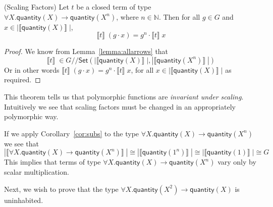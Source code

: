 \documentclass[a4paper,UKenglish]{lipics}
\newcommand{\msf}[1]{\mathsf{#1}} %
\newcommand{\Set}{\msf{Set}}
\newcommand{\GroupSet}[1]{#1/\!/\Set}
\newcommand{\GSet}{\GroupSet{G}}
\newcommand{\sem}[1]{\ensuremath{\llbracket #1 \rrbracket} \;}
\newcommand{\qnt}{\msf{quantity}}
\begin{document}
\begin{theorem}(Scaling Factors)
\label{thm:ScalFact}
Let $t$ be a closed term of type $\forall X. \qnt(X) \rightarrow \qnt(X^n)$, where $n\in \mathbb{N}$. Then for all $g \in G$ and $x \in |\sem{\qnt(X)}|$,
\[
\sem{t} (g \cdot x) = g^n \cdot \sem{t} x
\]
\end{theorem}
\begin{proof}
We know from Lemma~\ref{lemma:allarrows} that
\[
\sem{t} \in \GSet(|\sem{\qnt(X)}|,|\sem{\qnt(X^n)}|)
\]
Or in other words $\sem{t} (g \cdot x) = g^n \cdot \sem{t} x$, for all $x \in |\sem{\qnt(X)}|$ as required.
\end{proof}
This theorem tells us that polymorphic functions are \emph{invariant under scaling}. Intuitively we see that scaling factors must be changed in an appropriately polymorphic way.

If we apply Corollary~\ref{cor:subs} to the type $\forall X. \qnt(X)\rightarrow \qnt(X^n)$ we see that
\[
 |\sem{\forall X. \qnt(X)\rightarrow \qnt(X^n)}| \cong |\sem{\qnt(1^n)}| \cong |\sem{\qnt(1)}| \cong G
\]
This implies that terms of type $\forall X. \qnt(X)\rightarrow \qnt(X^n)$ vary only by scalar multiplication.


Next, we wish to prove that the type  $\forall X . \qnt(X^2) \rightarrow \qnt(X)$ is uninhabited.
\end{document}
